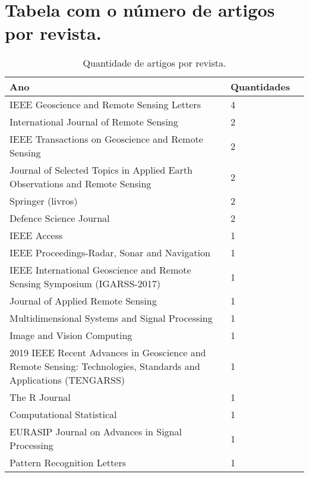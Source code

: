 \documentclass{article}
\begin{document}
\section{Tabela com o número de artigos por revista.}
\begin{sidewaystable}                                                                      \centering
        \caption{Quantidade de artigos por revista.}\label{tab02}
\begin{tabular}{@{}llr@{}} \toprule
        Ano & Quantidades  \\ \midrule                
     IEEE Geoscience and Remote Sensing Letters                & 4 \\
     International Journal of Remote Sensing                   & 2  \\
     IEEE Transactions on Geoscience and Remote Sensing        & 2 \\
     Journal of Selected Topics in Applied Earth Observations and Remote Sensing      & 2 \\
     Springer (livros)                                         & 2\\
     Defence Science Journal                                   & 2\\
     IEEE Access                                               & 1 \\
     IEEE Proceedings-Radar, Sonar and Navigation              & 1 \\
     IEEE International Geoscience and Remote Sensing Symposium (IGARSS-2017) & 1\\
     Journal of Applied Remote Sensing                         & 1\\
     Multidimensional Systems and Signal Processing            & 1\\
     Image and Vision Computing                                & 1 \\
     2019 IEEE Recent Advances in Geoscience and Remote Sensing: Technologies, Standards and Applications (TENGARSS) & 1\\
     The R Journal                                             & 1\\
     Computational Statistical                                 & 1 \\
      EURASIP Journal on Advances in Signal Processing         & 1 \\
      Pattern Recognition Letters                              & 1  \\     \bottomrule
\end{tabular}
\end{sidewaystable}  
\end{document}
